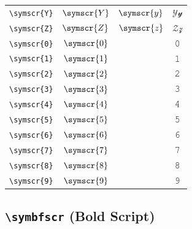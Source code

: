 \documentclass[12pt,a4paper]{article}
\begin{document}
\begin{longtable}{|c|c|c|c|}
\verb|\symscr{Y}| & $\symscr{Y}$ & $\symscr{y}$ & $ 𝒴 𝓎 $ \\
\verb|\symscr{Z}| & $\symscr{Z}$ & $\symscr{z}$ & $ 𝒵 𝓏 $ \\
\verb|\symscr{0}| & $\symscr{0}$ & & 𝟶 \\
\verb|\symscr{1}| & $\symscr{1}$ & & 𝟷 \\
\verb|\symscr{2}| & $\symscr{2}$ & & 𝟸 \\
\verb|\symscr{3}| & $\symscr{3}$ & & 𝟹 \\
\verb|\symscr{4}| & $\symscr{4}$ & & 𝟺 \\
\verb|\symscr{5}| & $\symscr{5}$ & & 𝟻 \\
\verb|\symscr{6}| & $\symscr{6}$ & & 𝟼 \\
\verb|\symscr{7}| & $\symscr{7}$ & & 𝟽 \\
\verb|\symscr{8}| & $\symscr{8}$ & & 𝟾 \\
\verb|\symscr{9}| & $\symscr{9}$ & & 𝟿 \\
\hline
\end{longtable}

\newpage

\subsection*{\texttt{\textbackslash{}symbfscr} (Bold Script)}
\end{document}
